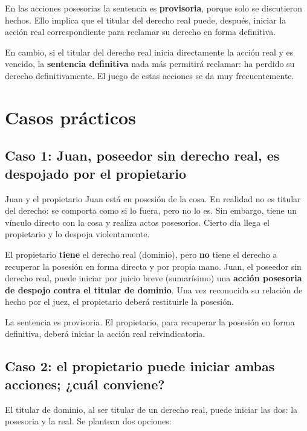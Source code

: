 \documentclass[12pt,oneside]{book}
\begin{document}
En las acciones posesorias la sentencia es \textbf{provisoria}, porque solo se discutieron hechos. Ello implica que el titular del derecho real puede, después, iniciar la acción real correspondiente para reclamar su derecho en forma definitiva.

En cambio, si el titular del derecho real inicia directamente la acción real y es vencido, la \textbf{sentencia definitiva} nada más permitirá reclamar: ha perdido su derecho definitivamente. El juego de estas acciones se da muy frecuentemente.

\section{Casos prácticos}

\subsection{Caso 1: Juan, poseedor sin derecho real, es despojado por el propietario}

\begin{example}{Juan y el propietario}
Juan está en posesión de la cosa. En realidad no es titular del derecho: se comporta como si lo fuera, pero no lo es. Sin embargo, tiene un vínculo directo con la cosa y realiza actos posesorios. Cierto día llega el propietario y lo despoja violentamente.
\end{example}

El propietario \textbf{tiene} el derecho real (dominio), pero \textbf{no} tiene el derecho a recuperar la posesión en forma directa y por propia mano. Juan, el poseedor sin derecho real, puede iniciar por juicio breve (sumarísimo) una \textbf{acción posesoria de despojo contra el titular de dominio}. Una vez reconocida su relación de hecho por el juez, el propietario deberá restituirle la posesión.

\begin{important}
La sentencia es provisoria. El propietario, para recuperar la posesión en forma definitiva, deberá iniciar la acción real reivindicatoria.
\end{important}

\subsection{Caso 2: el propietario puede iniciar ambas acciones; ¿cuál conviene?}

El titular de dominio, al ser titular de un derecho real, puede iniciar las dos: la posesoria y la real. Se plantean dos opciones:
\end{document}
